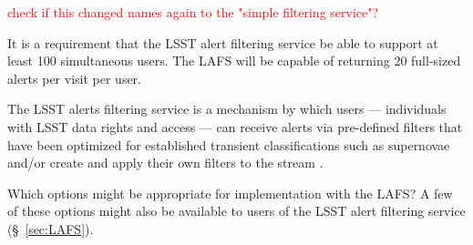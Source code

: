 \documentclass[DM,lsstdraft,authoryear,toc]{lsstdoc}
\begin{document}
\textcolor{red}{check if this changed names again to the "simple filtering service"?}

It is a requirement that the LSST alert filtering service be able to support at least 100 simultaneous users. The LAFS will be capable of returning 20 full-sized alerts per visit per user.

The LSST alerts filtering service is a mechanism by which users --- individuals with LSST data rights and access --- can receive alerts via pre-defined filters that have been optimized for established transient classifications such as supernovae and/or create and apply their own filters to the stream . 

Which options might be appropriate for implementation with the LAFS?
A few of these options might also be available to users of the LSST alert filtering service (\S~\ref{sec:LAFS}).



\end{document}
